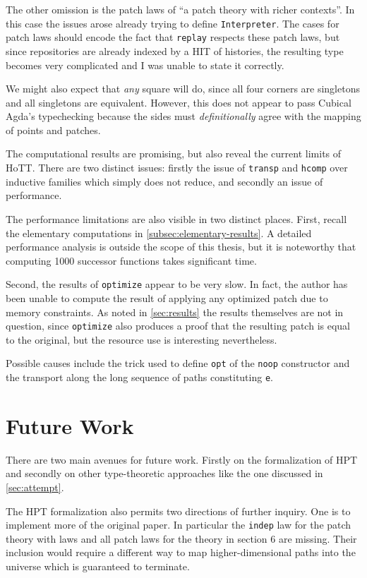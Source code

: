 The other omission is the patch laws of ``a patch theory with richer contexts''.
In this case the issues arose already trying to define \texttt{Interpreter}. The
cases for patch laws should encode the fact that \texttt{replay} respects these
patch laws, but since repositories are already indexed by a HIT of histories,
the resulting type becomes very complicated and I was unable to state it
correctly.

We might also expect that \emph{any} square will do, since all four corners are
singletons and all singletons are equivalent. However, this does not appear to
pass Cubical Agda's typechecking because the sides must \emph{definitionally}
agree with the mapping of points and patches.

The computational results are promising, but also reveal the current limits of
HoTT. There are two distinct issues: firstly the issue of \texttt{transp} and
\texttt{hcomp} over inductive families which simply does not reduce, and
secondly an issue of performance.

The performance limitations are also visible in two distinct places. First,
recall the elementary computations in \autoref{subsec:elementary-results}. A
detailed performance analysis is outside the scope of this thesis, but it is
noteworthy that computing 1000 successor functions takes significant time.

Second, the results of \texttt{optimize} appear to be very slow. In fact, the
author has been unable to compute the result of applying any optimized patch due
to memory constraints. As noted in \autoref{sec:results} the results themselves
are not in question, since \texttt{optimize} also produces a proof that the
resulting patch is equal to the original, but the resource use is interesting
nevertheless.

Possible causes include the trick used to define \texttt{opt} of the \texttt{noop}
constructor and the transport along the long sequence of paths constituting \texttt{e}.

\section{Future Work}

There are two main avenues for future work. Firstly on the formalization of HPT
and secondly on other type-theoretic approaches like the one discussed in
\autoref{sec:attempt}.

The HPT formalization also permits two directions of further inquiry. One is to
implement more of the original paper. In particular the \texttt{indep} law for
the patch theory with laws and all patch laws for the theory in section 6 are
missing. Their inclusion would require a different way to map higher-dimensional
paths into the universe which is guaranteed to terminate.

